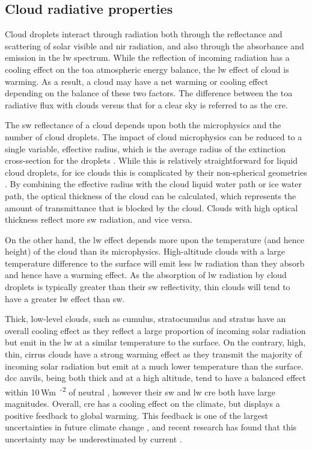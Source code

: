 \subsection{Cloud radiative properties}

Cloud droplets interact through radiation both through the reflectance and scattering of solar visible and \acrfull{nir} radiation, and also through the absorbance and emission in the \acrshort{lw} spectrum.
While the reflection of incoming radiation has a cooling effect on the \acrfull{toa} atmospheric energy balance, the \acrshort{lw} effect of cloud is warming.
As a result, a cloud may have a net warming or cooling effect depending on the balance of these two factors.
The difference between the \acrshort{toa} radiative flux with clouds versus that for a clear sky is referred to as the \acrshort{cre}.

The \acrshort{sw} reflectance of a cloud depends upon both the microphysics and the number of cloud droplets.
The impact of cloud microphysics can be reduced to a single variable, effective radius, which is the average radius of the extinction cross-section for the droplets \citep{liou_radiation_1992}.
While this is relatively straightforward for liquid cloud droplets, for ice clouds this is complicated by their non-spherical geometries \citep{wyser_effective_1998}.
By combining the effective radius with the cloud liquid water path or ice water path, the optical thickness of the cloud can be calculated, which represents the amount of transmittance that is blocked by the cloud.
Clouds with high optical thickness reflect more \acrshort{sw} radiation, and vice versa.

On the other hand, the \acrshort{lw} effect depends more upon the temperature (and hence height) of the cloud than its microphysics.
High-altitude clouds with a large temperature difference to the surface will emit less \acrshort{lw} radiation than they absorb and hence have a warming effect.
As the absorption of \acrshort{lw} radiation by cloud droplets is typically greater than their \acrshort{sw} reflectivity, thin clouds will tend to have a greater \acrshort{lw} effect than \acrshort{sw}.

Thick, low-level clouds, such as cumulus, stratocumulus and stratus have an overall cooling effect as they reflect a large proportion of incoming solar radiation but emit in the \acrshort{lw} at a similar temperature to the surface. 
On the contrary, high, thin, cirrus clouds have a strong warming effect as they transmit the majority of incoming solar radiation but emit at a much lower temperature than the surface. 
\acrshort{dcc} anvils, being both thick and at a high altitude, tend to have a balanced effect within 10\,\unit{Wm\textsuperscript{-2}} of neutral \citep{ramanathan_cloud-radiative_1989, hartmann_effect_1992, hartmann_tropical_2016}, however their \acrshort{sw} and \acrshort{lw} \acrshort{cre} both have large magnitudes. Overall, \acrshort{cre} has a cooling effect on the climate, but displays a positive feedback to global warming. This feedback is one of the largest uncertainties in future climate change \citep{sherwood_assessment_2020}, and recent research has found that this uncertainty may be underestimated by current  \citep{hill_climate_2023}.


